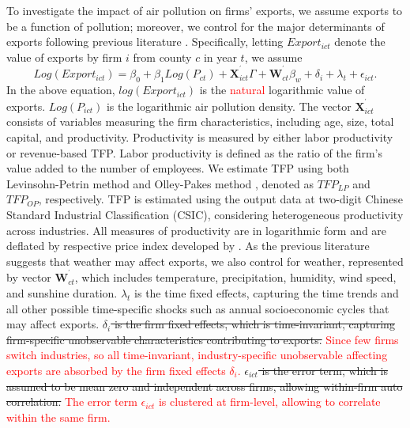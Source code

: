 \documentclass[12pt]{article}
\begin{document}
To investigate the impact of air pollution on firms' exports, we assume
exports to be a function of pollution; moreover, we control for the major
determinants of exports following previous literature %
\citep[e.g.,][]{kunst1989exports,bernard2003plants}. Specifically, letting $Export_{ict}$
denote the value of exports by firm $i$ from county $c$ in year $t$, we
assume 
\begin{equation}
Log(Export_{ict})=\beta _{0}+\beta _{1}Log(P_{ct})+\mathbf{X}%
_{ict}^{^{\prime }}\Gamma +\mathbf{W}_{ct}^{^{\prime }}\beta _{w}+\delta
_{i}+\lambda _{t}+\epsilon _{ict}.  \label{equ1}
\end{equation}%
In the above equation, $log(Export_{ict})$ is the \textcolor{red}{natural} logarithmic value of
exports. $Log(P_{ict})$ is the logarithmic air pollution density. The vector 
$\mathbf{X}_{ict}^{^{\prime }}$ consists of variables measuring the firm
characteristics, including age, size, total capital, and productivity.
Productivity is measured by either labor productivity or revenue-based TFP.
Labor productivity is defined as the ratio of the firm's value added to the
number of employees. We estimate TFP using both Levinsohn-Petrin method %
\citep{levinsohn2003estimating} and Olley-Pakes method %
\citep{olley1996dynamics}, denoted as $TFP_{LP}$ and $TFP_{OP}$,
respectively. TFP is estimated using the output data at two-digit Chinese
Standard Industrial Classification (CSIC), considering heterogeneous
productivity across industries. All measures of productivity are in
logarithmic form and are deflated by respective price index developed by %
\citep{brandt2017wto}. As the previous literature %
\citep[e.g.,][]{jones2010climate} suggests that weather may affect exports,
we also control for weather, represented by vector $\mathbf{W}%
_{ct}^{^{\prime}}$, which includes temperature, precipitation, humidity,
wind speed, and sunshine duration. $\lambda _{t}$ is the time fixed effects,
capturing the time trends and all other possible time-specific shocks such
as annual socioeconomic cycles that may affect exports. \sout{$\delta _{i}$ is the
firm fixed effects, which is time-invariant, capturing firm-specific
unobservable characteristics contributing to exports.} \textcolor{red}{Since few
firms switch industries, so all time-invariant, industry-specific
unobservable affecting exports are absorbed by the firm fixed effects $\delta _{i}$.} \sout{$\epsilon _{ict}$ is
the error term, which is assumed to be mean zero and independent across
firms, allowing within-firm auto correlation.} \textcolor{red}{The error term $\epsilon _{ict}$ is clustered at firm-level, allowing to correlate within the same firm.}
\end{document}
